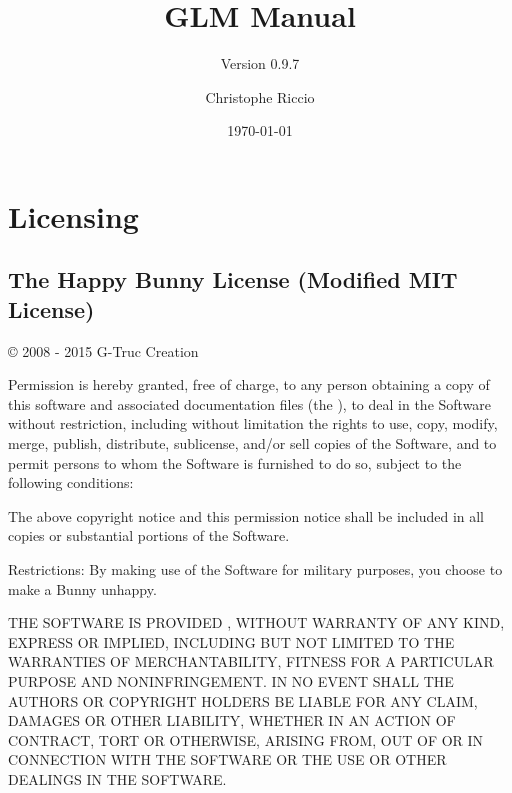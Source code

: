 \documentclass{scrartcl}
\numberwithin{figure}{subsection}
\begin{document}
\newcommand{\glmheader}[1]{\href{https://github.com/g-truc/glm/tree/master/glm/#1.hpp}{\texttt{<glm/#1.hpp>}}}

\author{Christophe Riccio}
\subtitle{Version 0.9.7}

\title{GLM Manual}
\date{\today{}} %

\maketitle{} %

\pagebreak{}

\section*{Licensing}

\subsection*{\hypertarget{happybunny}{The Happy Bunny License (Modified MIT License)}}

\copyright{} 2008 - 2015 G-Truc Creation

Permission is hereby granted, free of charge, to any person obtaining a copy of this software and associated documentation files (the ), to deal in the Software without restriction, including without limitation the rights to use, copy, modify, merge, publish, distribute, sublicense, and/or sell copies of the Software, and to permit persons to whom the Software is furnished to do so, subject to the following conditions:

The above copyright notice and this permission notice shall be included in all copies or substantial portions of the Software.

Restrictions: By making use of the Software for military purposes, you choose to make a Bunny unhappy.

THE SOFTWARE IS PROVIDED , WITHOUT WARRANTY OF ANY KIND, EXPRESS OR IMPLIED, INCLUDING BUT NOT LIMITED TO THE WARRANTIES OF MERCHANTABILITY, FITNESS FOR A PARTICULAR PURPOSE AND NONINFRINGEMENT. IN NO EVENT SHALL THE AUTHORS OR COPYRIGHT HOLDERS BE LIABLE FOR ANY CLAIM, DAMAGES OR OTHER LIABILITY, WHETHER IN AN ACTION OF CONTRACT, TORT OR OTHERWISE, ARISING FROM, OUT OF OR IN CONNECTION WITH THE SOFTWARE OR THE USE OR OTHER DEALINGS IN THE SOFTWARE.
\end{document}
